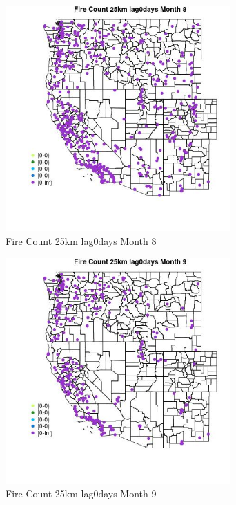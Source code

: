 \begin{figure} 
\centering  
\includegraphics[width=0.77\textwidth]{Code_Outputs/Report_ML_input_PM25_Step4_part_e_de_duplicated_aves_compiled_2019-05-18wNAs_MapObsMo8Fire_Count_25km_lag0days.jpg} 
\caption{\label{fig:Report_ML_input_PM25_Step4_part_e_de_duplicated_aves_compiled_2019-05-18wNAsMapObsMo8Fire_Count_25km_lag0days}Fire Count 25km lag0days Month 8} 
\end{figure} 
 

\begin{figure} 
\centering  
\includegraphics[width=0.77\textwidth]{Code_Outputs/Report_ML_input_PM25_Step4_part_e_de_duplicated_aves_compiled_2019-05-18wNAs_MapObsMo9Fire_Count_25km_lag0days.jpg} 
\caption{\label{fig:Report_ML_input_PM25_Step4_part_e_de_duplicated_aves_compiled_2019-05-18wNAsMapObsMo9Fire_Count_25km_lag0days}Fire Count 25km lag0days Month 9} 
\end{figure} 
 

